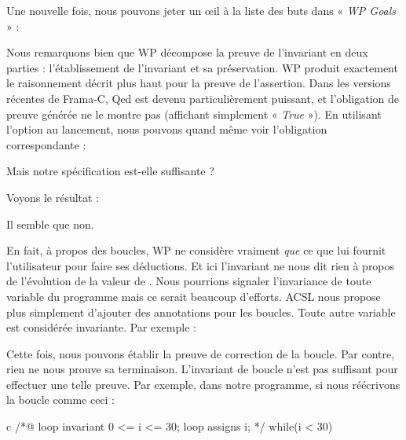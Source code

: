 Une nouvelle fois, nous pouvons jeter un œil à la liste des buts dans « \textit{WP 
Goals} » :





Nous remarquons bien que WP décompose la preuve de l'invariant en deux parties : 
l'établissement de l'invariant et sa préservation. WP produit exactement le 
raisonnement décrit plus haut pour la preuve de l'assertion. Dans les versions
récentes de Frama-C, Qed est devenu particulièrement puissant, et l'obligation de
preuve générée ne le montre pas (affichant simplement « \textit{True} »). En utilisant 
l'option  au lancement, nous pouvons quand même voir 
l'obligation correspondante :





Mais notre spécification est-elle suffisante ?






Voyons le résultat :





Il semble que non.





En fait, à propos des boucles, WP ne considère vraiment \textit{que} ce que lui 
fournit l'utilisateur pour faire ses déductions. Et ici l'invariant ne nous dit
rien à propos de l'évolution de la valeur de . Nous pourrions signaler 
l'invariance de toute variable du programme mais ce serait beaucoup d'efforts. 
ACSL nous propose plus simplement d'ajouter des annotations  pour 
les boucles. Toute autre variable est considérée invariante. Par exemple :





Cette fois, nous pouvons établir la preuve de correction de la boucle. Par contre, 
rien ne nous prouve sa terminaison. L'invariant de boucle n'est pas suffisant pour 
effectuer une telle preuve. Par exemple, dans notre programme, si nous réécrivons 
la boucle comme ceci :



\begin{CodeBlock}{c}
/*@
  loop invariant 0 <= i <= 30;
  loop assigns i;
*/
while(i < 30){
   
}
\end{CodeBlock}



